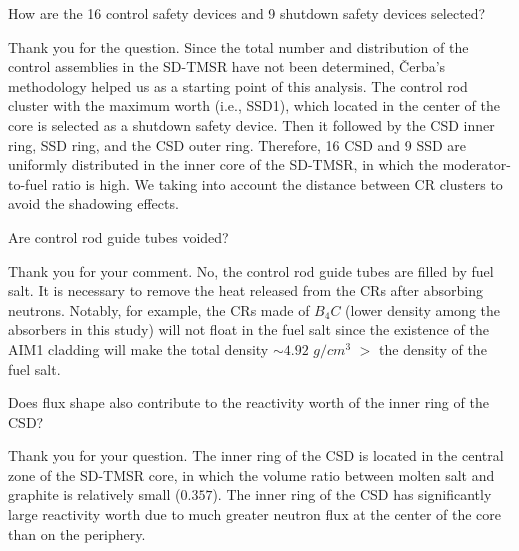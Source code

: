 \documentclass[answers,11pt]{exam}
\begin{document}
\begin{questions}
\begin{solution}
                 
        \end{solution}

        \question  How are the 16 control safety devices and 9 shutdown safety devices selected?
        \begin{solution}
        	Thank you for the question. Since the total number and distribution of the control assemblies in the SD-TMSR have not been determined, \v{C}erba's methodology \cite{vcerba2017optimization} helped us as a starting point of this analysis. The control rod cluster with the maximum worth (i.e., SSD1), which located in the center of the core is selected as a shutdown safety device.
        	Then it followed by the CSD inner ring, SSD ring, and the CSD outer ring. Therefore, 16 CSD and 9 SSD are uniformly distributed in the inner core of the SD-TMSR, in which the moderator-to-fuel ratio is high. We taking into account the distance between CR clusters to avoid the shadowing effects.
        	

        \end{solution}

        \question Are control rod guide tubes voided?
        \begin{solution}
                Thank you for your comment. No, the control rod guide tubes are filled by fuel salt. It is necessary to remove the heat released from the CRs after absorbing neutrons. Notably, for example, the CRs made of $B_{4}C$ (lower density among the absorbers in this study) will not float in the fuel salt since the existence of the AIM1 cladding will make the total density $\sim 4.92$ $g/cm^3$ $>$ the density of the fuel salt.
                 
                
              
                
                
                

        \end{solution}

        \question Does flux shape also contribute to the reactivity worth of the inner ring of the CSD?
        \begin{solution}
                 Thank you for your question. The inner ring of the CSD is located in the central zone of the SD-TMSR core, in which the volume ratio between molten salt and graphite is relatively small ($0.357$). The inner ring of the CSD has significantly large reactivity worth due to much greater neutron flux at the center of the core than on the periphery.


\end{solution}
\end{questions}
\end{document}
